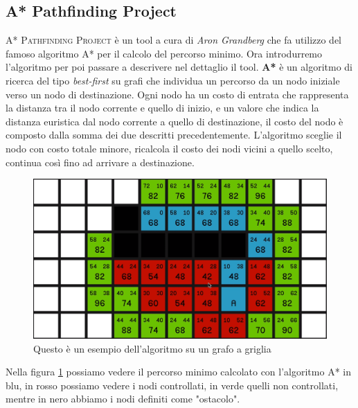 \documentclass[12pt, openany]{book}
\begin{document}
	\subsection{A* Pathfinding Project}
	\textsc{A* Pathfinding Project} \cite{A*} è un tool a cura di \emph{Aron Grandberg} che fa utilizzo del famoso algoritmo A* per il calcolo del percorso minimo.
		Ora introdurremo l'algoritmo per poi passare a descrivere nel dettaglio il tool.
		\textbf{A*} è un algoritmo di ricerca del tipo \emph{best-first} su grafi che individua un percorso da un nodo iniziale verso un nodo di destinazione. Ogni nodo ha un costo di entrata che rappresenta la distanza tra il nodo corrente e quello di inizio, e un valore che indica la distanza euristica dal nodo corrente a quello di destinazione, il costo del nodo è composto dalla somma dei due descritti precedentemente. L'algoritmo sceglie il nodo con costo totale minore, ricalcola il costo dei nodi vicini a quello scelto, continua così fino ad arrivare a destinazione.
		\begin{figure}[H]
			\centering
			\includegraphics[width=1\linewidth]{"Immagini/AStar"}
			\caption{Questo è un esempio dell'algoritmo su un grafo a griglia}
			\label{fig:AStar}
		\end{figure}
		Nella figura \ref{fig:AStar} possiamo vedere il percorso minimo calcolato con l'algoritmo A* in blu, in rosso possiamo vedere i nodi controllati, in verde quelli non controllati, mentre in nero abbiamo i nodi definiti come "ostacolo". 
\end{document}
